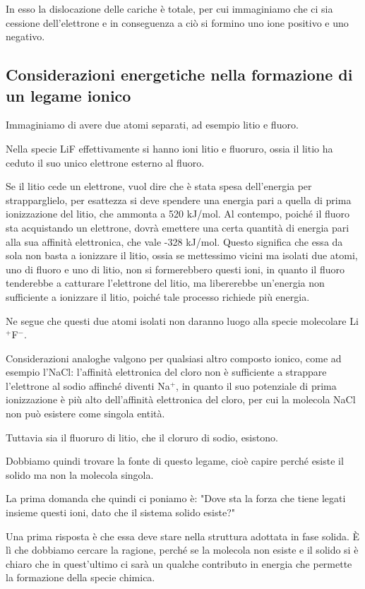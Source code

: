 In esso la dislocazione delle cariche è totale, per cui immaginiamo che ci sia cessione dell'elettrone e in conseguenza a ciò si formino uno ione positivo e uno negativo.

\subsection{Considerazioni energetiche nella formazione di un legame ionico}
Immaginiamo di avere due atomi separati, ad esempio litio e fluoro.

Nella specie LiF effettivamente si hanno ioni litio e fluoruro, ossia il litio ha ceduto il suo unico elettrone esterno al fluoro.

Se il litio cede un elettrone, vuol dire che è stata spesa dell'energia per strapparglielo, per esattezza si deve spendere una energia pari a quella di prima ionizzazione del litio, che ammonta a 520 kJ/mol.
Al contempo, poiché il fluoro sta acquistando un elettrone, dovrà emettere una certa quantità di energia pari alla sua affinità elettronica, che vale -328 kJ/mol. Questo significa che essa da sola non basta a ionizzare il litio, ossia se mettessimo vicini ma isolati due atomi, uno di fluoro e uno di litio, non si formerebbero questi ioni, in quanto il fluoro tenderebbe a catturare l'elettrone del litio, ma libererebbe un'energia non sufficiente a ionizzare il litio, poiché tale processo richiede più energia.

Ne segue che questi due atomi isolati non daranno luogo alla specie molecolare Li$^+$F$^-$.

Considerazioni analoghe valgono per qualsiasi altro composto ionico, come ad esempio l'NaCl: l'affinità elettronica del cloro non è sufficiente a strappare l'elettrone al sodio affinché diventi Na$^+$, in quanto il suo potenziale di prima ionizzazione è più alto dell'affinità elettronica del cloro, per cui la molecola NaCl non può esistere come singola entità.

Tuttavia sia il fluoruro di litio, che il cloruro di sodio, esistono.

Dobbiamo quindi trovare la fonte di questo legame, cioè capire perché esiste il solido ma non la molecola singola.

La prima domanda che quindi ci poniamo è: "Dove sta la forza che tiene legati insieme questi ioni, dato che il sistema solido esiste?"

Una prima risposta è che essa deve stare nella struttura adottata in fase solida. È lì che dobbiamo cercare la ragione, perché se la molecola non esiste e il solido si è chiaro che in quest'ultimo ci sarà un qualche contributo in energia che permette la formazione della specie chimica.

